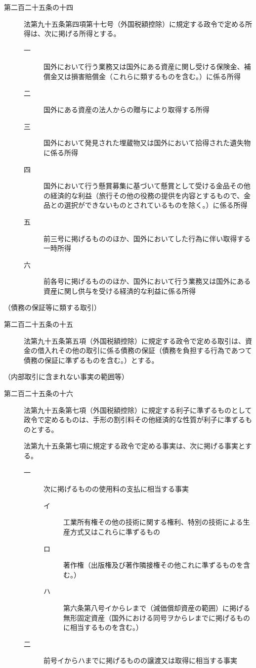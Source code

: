 \documentclass[twocolumn,a4j,10pt]{ltjtarticle}
\begin{document}
\begin{description}
\item[第二百二十五条の十四]法第九十五条第四項第十七号（外国税額控除）に規定する政令で定める所得は、次に掲げる所得とする。
\begin{description}
\item[一]国外において行う業務又は国外にある資産に関し受ける保険金、補償金又は損害賠償金（これらに類するものを含む。）に係る所得
\item[二]国外にある資産の法人からの贈与により取得する所得
\item[三]国外において発見された埋蔵物又は国外において拾得された遺失物に係る所得
\item[四]国外において行う懸賞募集に基づいて懸賞として受ける金品その他の経済的な利益（旅行その他の役務の提供を内容とするもので、金品との選択ができないものとされているものを除く。）に係る所得
\item[五]前三号に掲げるもののほか、国外においてした行為に伴い取得する一時所得
\item[六]前各号に掲げるもののほか、国外において行う業務又は国外にある資産に関し供与を受ける経済的な利益に係る所得
\end{description}
\end{description}
\noindent\hspace{10pt}（債務の保証等に類する取引）
\begin{description}
\item[第二百二十五条の十五]法第九十五条第五項（外国税額控除）に規定する政令で定める取引は、資金の借入れその他の取引に係る債務の保証（債務を負担する行為であつて債務の保証に準ずるものを含む。）とする。
\end{description}
\noindent\hspace{10pt}（内部取引に含まれない事実の範囲等）
\begin{description}
\item[第二百二十五条の十六]法第九十五条第七項（外国税額控除）に規定する利子に準ずるものとして政令で定めるものは、手形の割引料その他経済的な性質が利子に準ずるものとする。
\item[]法第九十五条第七項に規定する政令で定める事実は、次に掲げる事実とする。
\begin{description}
\item[一]次に掲げるものの使用料の支払に相当する事実
\begin{description}
\item[イ]工業所有権その他の技術に関する権利、特別の技術による生産方式又はこれらに準ずるもの
\item[ロ]著作権（出版権及び著作隣接権その他これに準ずるものを含む。）
\item[ハ]第六条第八号イからレまで（減価償却資産の範囲）に掲げる無形固定資産（国外における同号ヲからレまでに掲げるものに相当するものを含む。）
\end{description}
\item[二]前号イからハまでに掲げるものの譲渡又は取得に相当する事実
\end{description}
\end{description}
\end{document}
